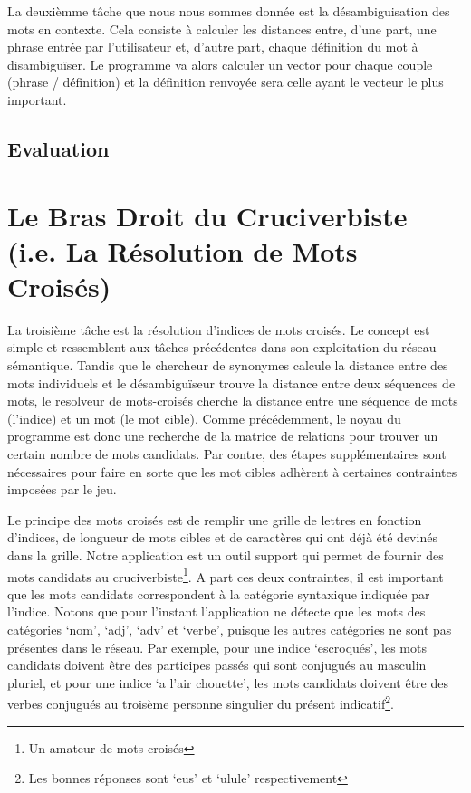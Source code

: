 \documentclass[a4paper, 12pt]{article}
\begin{document}
La deuxièmme tâche que nous nous sommes donnée est la désambiguisation des mots
en contexte. Cela consiste à calculer les distances entre, d'une part, une phrase 
entrée par l'utilisateur et, d'autre part, chaque définition du mot à 
disambiguïser. Le programme va alors calculer un vector pour chaque couple
(phrase / définition) et la définition renvoyée sera celle ayant le vecteur le
plus important. 

\subsection{Evaluation}


\section{Le Bras Droit du Cruciverbiste (i.e. La Résolution de Mots Croisés)}

La troisième tâche est la résolution d'indices de mots croisés. Le concept est 
simple et ressemblent aux tâches précédentes dans son exploitation du réseau 
sémantique. Tandis que le chercheur de synonymes calcule la distance entre des 
mots individuels et le désambiguïseur trouve la distance entre deux séquences de 
mots, le resolveur de mots-croisés cherche la distance entre une séquence de 
mots (l'indice) et un mot (le mot cible). Comme précédemment, le noyau du 
programme est donc une recherche de la matrice de relations pour trouver un 
certain nombre de mots candidats. Par contre, des étapes supplémentaires sont 
nécessaires pour faire en sorte que les mot cibles adhèrent à certaines 
contraintes imposées par le jeu.

Le principe des mots croisés est de remplir une grille de lettres en fonction 
d'indices, de longueur de mots cibles et de caractères qui ont déjà été devinés 
dans la grille. Notre application est un outil support qui permet de fournir des 
mots candidats au cruciverbiste\footnote{Un amateur de mots croisés}. A part ces 
deux contraintes, il est important que les mots candidats correspondent à la 
catégorie syntaxique indiquée par l'indice. Notons que pour l'instant 
l'application ne détecte que les mots des catégories \lq{nom}\rq, \lq{adj}\rq, 
\lq{adv}\rq{} et \lq{verbe}\rq, puisque les autres catégories ne sont pas 
présentes dans le réseau. Par exemple, pour une indice \lq{escroqués}\rq, les 
mots candidats doivent être des participes passés qui sont conjugués au masculin 
pluriel, et pour une indice \lq{a l'air chouette}\rq, les mots candidats doivent 
être des verbes conjugués au troisème personne singulier du présent 
indicatif\footnote{Les bonnes réponses sont \lq{eus}\rq{}  et \lq{ulule}\rq{} 
respectivement}.
\end{document}
